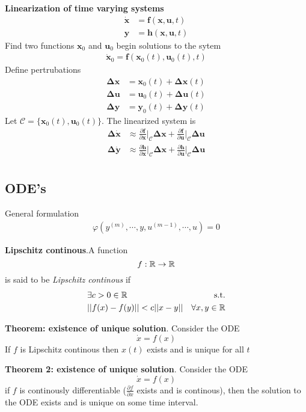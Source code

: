 \textbf{Linearization of time varying systems}
\begin{align*}
    \dot{\bm{x}} &= \bm{f}(\bm{x},\bm{u},t) \\
    \bm{y} &= \bm{h}(\bm{x},\bm{u},t)
\end{align*}
Find two functions \(\bm{x}_0\) and \(\bm{u}_0\) begin solutions to the sytem
\begin{align*}
    \dot{\bm{x}}_0 = \bm{f}(\bm{x}_0(t),\bm{u}_0(t),t)
\end{align*}
Define pertrubations
\begin{align*}
    \bm{\Delta x} &= \bm{x}_0(t) + \bm{\Delta x}(t) \\
    \bm{\Delta u} &= \bm{u}_0(t) + \bm{\Delta u}(t) \\
    \bm{\Delta y} &= \bm{y}_0(t) + \bm{\Delta y}(t)
\end{align*}
Let \(\mathcal{C} = \{\bm{x}_0(t),\bm{u}_0(t)\}\). The linearized system is
\begin{align*}
    \bm{\Delta \dot{x}} &\approx \frac{\partial\bm{f}}{\partial\bm{x}}\Big|_{\mathcal{C}} \bm{\Delta x} +
        \frac{\partial\bm{f}}{\partial\bm{u}}\Big|_{\mathcal{C}}\bm{\Delta u} \\
    \bm{\Delta \dot{y}} &\approx \frac{\partial\bm{h}}{\partial\bm{x}}\Big|_{\mathcal{C}} \bm{\Delta x} +
        \frac{\partial\bm{h}}{\partial\bm{u}}\Big|_{\mathcal{C}}\bm{\Delta u} \\
\end{align*}

\setcounter{subsection}{4}
\subsection{ODE's} %
General formulation
\begin{align*}
    \varphi(y^{(m)},\cdots,y,u^{(m-1)},\cdots,u) = 0
\end{align*}

\textbf{Lipschitz continous}.A function \[f:\mathbb{R} \rightarrow \mathbb{R}\] is said to be \textit{Lipschitz continous} if
\begin{align*}
    &\exists c > 0 \in \mathbb{R} & \textrm{s.t.}\\ &||f(x)-f(y)||<c||x-y|| & \forall x, y \in \mathbb{R}
\end{align*}

\textbf{Theorem: existence of unique solution}. Consider the ODE
\[\dot{x}=f(x)\]
If \(f\) is Lipschitz continous then \(x(t)\) exists and is unique for all \(t\)

\textbf{Theorem 2: existence of unique solution}. Consider the ODE
\[\dot{x}=f(x)\]
if \(f\) is continously differentiable (\(\frac{\partial f}{\partial x}\) exists and is continous), then the solution to the ODE exists and is unique on some time interval.

